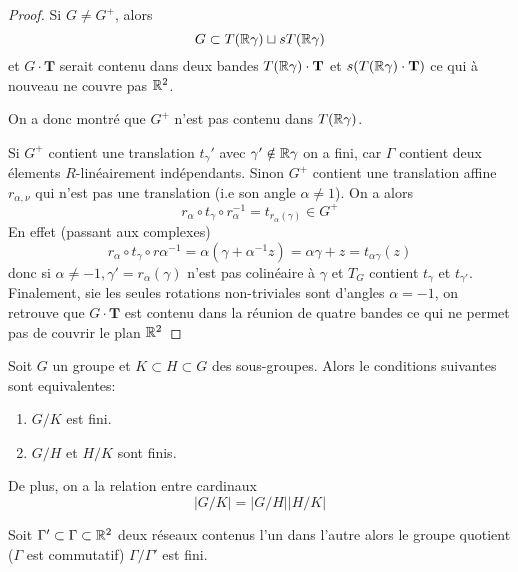 \begin{proof}
	Si $G \neq G^+$, alors
	\begin{equation*}
		G \subset T(\mathbb{R}\gamma) \sqcup sT(\mathbb{R}\gamma)
	\end{equation*}
	et $G \cdot \mathbf{T}$ serait contenu dans deux bandes
	$T(\mathbb{R}\gamma) \cdot \mathbf{T}$ et $s(T(\mathbb{R}\gamma) \cdot \mathbf{T})$ ce qui à
	nouveau ne couvre pas $\mathbb{R}^2$.

	On a donc montré que $G^+$ n'est pas contenu dans $T(\mathbb{R} \gamma)$.

	Si $G^+$ contient une translation $t_\gamma'$ avec $\gamma' \notin \mathbb{R}\gamma$
	on a fini, car $\Gamma$ contient deux élements $R$-linéairement
	indépendants. Sinon $G^+$ contient une translation affine $r_{\alpha, \nu}$
	qui n'est pas une translation (i.e son angle $\alpha \neq 1$). On a alors
	\begin{equation*}
		r_\alpha \circ t_\gamma \circ r_\alpha^{-1} = t_{r_\alpha(\gamma)} \in G^+
	\end{equation*}
	En effet (passant aux complexes)
	\begin{equation*}
		r_\alpha \circ t_\gamma \circ r\alpha^{-1} = \alpha(\gamma + \alpha^{-1}z)
		= \alpha\gamma + z = t_{\alpha\gamma}(z)
	\end{equation*}
	donc si $\alpha \neq -1, \gamma' = r_\alpha(\gamma)$ n'est pas colinéaire à
	$\gamma$ et $T_G$ contient $t_\gamma$ et $t_{\gamma'}$.
	Finalement, sie les seules rotations non-triviales sont d'angles $\alpha =
	-1$, on retrouve que $G\cdot\mathbf{T}$ est contenu dans la réunion de
	quatre bandes ce qui ne permet pas de couvrir le plan $\mathbb{R}^2$
\end{proof}

\begin{lemma}
	\label{lem:sous-groupes-finis}
	Soit $G$ un groupe et $K \subset H \subset G$ des sous-groupes. Alors le
	conditions suivantes sont equivalentes:
	\begin{enumerate}
		\item $G/K$ est fini.
		\item $G/H$ et $H/K$ sont finis.
	\end{enumerate}
	De plus, on a la relation entre cardinaux
	\begin{equation*}
		|G/K|=|G/H||H/K|
	\end{equation*}
\end{lemma}

\begin{proposition}
	Soit $\Gamma' \subset \Gamma \subset \mathbb{R}^2$ deux réseaux contenus l'un dans
	l'autre alors le groupe quotient ($\Gamma$ est commutatif) $\Gamma/\Gamma'$
	est fini.
\end{proposition}

